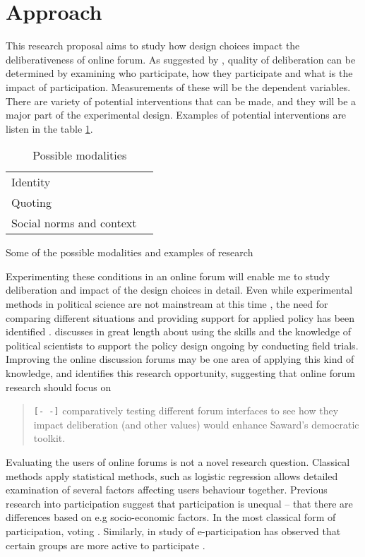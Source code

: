 \documentclass[journal,a4paper]{IEEEtran}
\begin{document}
\section{Approach}
This research proposal aims to study how design choices impact the deliberativeness of online forum. As suggested by , quality of deliberation can be determined by examining who participate, how they participate and what is the impact of participation. Measurements of these will be the dependent variables. There are variety of potential interventions that can be made, and they will be a major part of the experimental design. Examples of potential interventions are listen in the table \ref{tab:modalities}.

\begin{table}
\caption{Possible modalities}
\begin{tabular}{ll}
Identity & \cite{danet98,donath99}  \\ 
Quoting & \cite{eklundh94} \\ 
Social norms and context & \cite{sukumaran11,underhill03} \\
\end{tabular} 
\label{tab:modalities}
Some of the possible modalities and examples of research
\end{table}

Experimenting these conditions in an online forum will enable me to study deliberation and impact of the design choices in detail. Even while experimental methods in political science are not mainstream at this time \cite{green03,druckman06}, the need for comparing different situations and providing support for applied policy has been identified \cite{stoker10}.  discusses in great length about using the skills and the knowledge of political scientists to support the policy design ongoing by conducting field trials. Improving the online discussion forums may be one area of applying this kind of knowledge, and  identifies this research opportunity, suggesting that online forum research should focus on

\begin{quote}
\texttt{[- -]} comparatively testing different forum interfaces to see how they impact deliberation (and other values) would 
enhance Saward’s democratic toolkit.
\end{quote}

Evaluating the users of online forums is not a novel research question. Classical methods apply statistical methods, such as logistic regression allows detailed examination of several factors affecting users behaviour together. Previous research into participation suggest that participation is unequal -- that there are differences based on e.g socio-economic factors. In the most classical form of participation, voting . Similarly, in study of e-participation has observed that certain groups are more active to participate .
\end{document}

